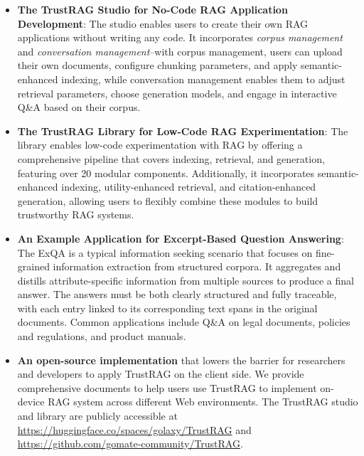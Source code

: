 \begin{itemize}
    \item \textbf{The TrustRAG Studio for No-Code \ac{RAG} Application Development}: The studio enables users to create their own \ac{RAG} applications without writing any code. It incorporates \textit{corpus management} and \textit{conversation management}--with corpus management, users can upload their own documents, configure chunking parameters,  and apply semantic-enhanced indexing, while conversation management enables them to adjust retrieval parameters, choose generation models, and engage in interactive Q\&A based on their corpus.
    \item \textbf{The TrustRAG Library for Low-Code \ac{RAG} Experimentation}: The library enables low-code experimentation with RAG by offering a comprehensive pipeline that covers indexing, retrieval, and generation, featuring over 20 modular components. Additionally, it incorporates semantic-enhanced indexing, utility-enhanced retrieval, and citation-enhanced generation, allowing users to flexibly combine these modules to build trustworthy RAG systems.
    \item \textbf{An Example Application for Excerpt-Based Question Answering}: The ExQA is a typical information seeking scenario that focuses on fine-grained information extraction from structured corpora. It aggregates and distills attribute-specific information from multiple sources to produce a final answer. The answers must be both clearly structured and fully traceable, with each entry linked to its corresponding text spans in the original documents. Common applications include Q\&A on legal documents, policies and regulations, and product manuals.
    \item \textbf{An open-source implementation} that lowers the barrier for researchers and developers to apply TrustRAG on the client side. We provide comprehensive documents to help users use TrustRAG to implement on-device \ac{RAG} system across different Web environments. The TrustRAG studio and library are publicly accessible at \url{https://huggingface.co/spaces/golaxy/TrustRAG} and \url{https://github.com/gomate-community/TrustRAG}.
\end{itemize}
